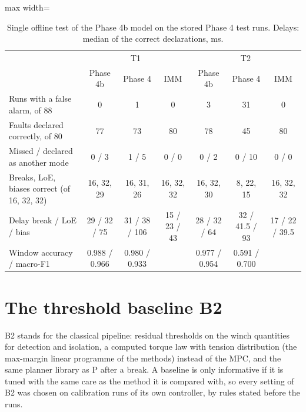 \documentclass[10pt]{article}
\begin{document}
\begin{table}[h]
\centering\small
\caption{Single offline test of the Phase 4b model on the stored Phase 4 test runs. Delays: median of the correct declarations, ms.}\label{tab:p4btest}
\begin{adjustbox}{max width=\linewidth}\begin{tabular}{@{}lccc|ccc@{}}
\toprule
 & \multicolumn{3}{c|}{T1} & \multicolumn{3}{c}{T2} \\
 & Phase 4b & Phase 4 & IMM & Phase 4b & Phase 4 & IMM \\
\midrule
Runs with a false alarm, of 88 & 0 & 1 & 0 & 3 & 31 & 0 \\
Faults declared correctly, of 80 & 77 & 73 & 80 & 78 & 45 & 80 \\
Missed / declared as another mode & 0 / 3 & 1 / 5 & 0 / 0 & 0 / 2 & 0 / 10 & 0 / 0 \\
Breaks, LoE, biases correct (of 16, 32, 32) & 16, 32, 29 & 16, 31, 26 & 16, 32, 32 & 16, 32, 30 & 8, 22, 15 & 16, 32, 32 \\
Delay break / LoE / bias & 29 / 32 / 75 & 31 / 38 / 106 & 15 / 23 / 43 & 28 / 32 / 64 & 32 / 41.5 / 93 & 17 / 22 / 39.5 \\
Window accuracy / macro-F1 & 0.988 / 0.966 & 0.980 / 0.933 & & 0.977 / 0.954 & 0.591 / 0.700 & \\
\bottomrule
\end{tabular}\end{adjustbox}
\end{table}

\section{The threshold baseline B2}\label{sec:b2}

B2 stands for the classical pipeline: residual thresholds on the winch quantities for detection and isolation, a computed torque law with tension distribution (the max-margin linear programme of the methods) instead of the MPC, and the same planner library as P after a break. A baseline is only informative if it is tuned with the same care as the method it is compared with, so every setting of B2 was chosen on calibration runs of its own controller, by rules stated before the runs.
\end{document}
